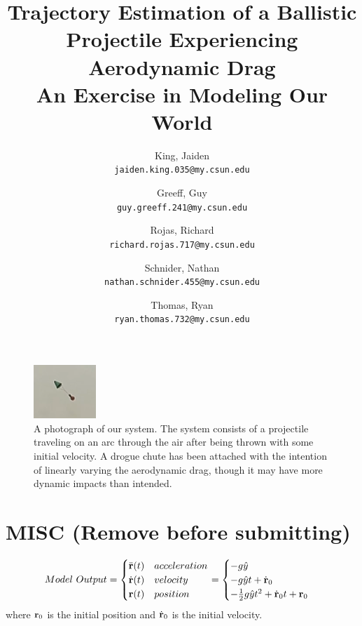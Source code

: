 \documentclass[12pt,english]{article}
\author{
	King, Jaiden\\
	\texttt{jaiden.king.035@my.csun.edu}
	\and
	Greeff, Guy\\
	\texttt{guy.greeff.241@my.csun.edu}
	\and
	Rojas, Richard\\
	\texttt{richard.rojas.717@my.csun.edu}
	\and
	Schnider, Nathan\\
	\texttt{nathan.schnider.455@my.csun.edu}
	\and
	Thomas, Ryan\\
	\texttt{ryan.thomas.732@my.csun.edu}
}
\title{Trajectory Estimation of a Ballistic Projectile Experiencing Aerodynamic Drag\\\large{An Exercise in Modeling Our World}}
\begin{document}
\maketitle

\tableofcontents

\begin{figure}[t]
\centering
\includegraphics[width=0.5\linewidth]{images/BallMidFlight.png}
\caption{\label{fig:BallMidFlight} A photograph of our system. The system consists of a projectile traveling on an arc through the air after being thrown with some initial velocity. A drogue chute has been attached with the intention of linearly varying the aerodynamic drag, though it may have more dynamic impacts than intended.}
\end{figure}











\section{MISC (Remove before submitting)}

\begin{align*}
Model\ Output =
\begin{cases} 
\ddot{\bf r}(t) & acceleration \\
\dot{\bf r}(t) & velocity \\
{\bf r}(t) & position
\end{cases}
= 
\begin{cases}
-g\hat{y} \\
-g\hat{y}t + \dot{\bf r}_0 \\
-\frac12g\hat{y}t^2 + \dot{\bf r}_0t + {\bf r}_0
\end{cases}
\end{align*}
where ${\bf r}_0$ is the initial position and $\dot{\bf r}_0$ is the initial velocity.
\end{document}
